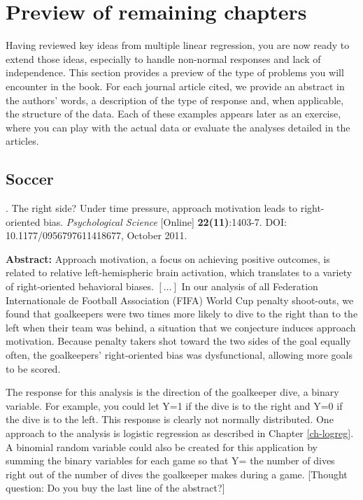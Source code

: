 \documentclass[
]{krantz}
\renewenvironment{quote}{\begin{VF}}{\end{VF}}
\begin{document}
\hypertarget{preview-of-remaining-chapters}{%
\section{Preview of remaining chapters}\label{preview-of-remaining-chapters}}

Having reviewed key ideas from multiple linear regression, you are now ready to extend those ideas, especially to handle non-normal responses and lack of independence. This section provides a preview of the type of problems you will encounter in the book. For each journal article cited, we provide an abstract in the authors' words, a description of the type of response and, when applicable, the structure of the data. Each of these examples appears later as an exercise, where you can play with the actual data or evaluate the analyses detailed in the articles.

\hypertarget{soccer}{%
\subsection{Soccer}\label{soccer}}

\citet{Roskes2011} . The right side? Under time pressure, approach motivation leads to right-oriented bias. \emph{Psychological Science} {[}Online{]} \textbf{22(11)}:1403-7. DOI: 10.1177/0956797611418677, October 2011.

\begin{quote}
\textbf{Abstract:} Approach motivation, a focus on achieving positive outcomes, is related to relative left-hemispheric brain activation, which translates to a variety of right-oriented behavioral biases. \([\ldots]\) In our analysis of all Federation Internationale de Football Association (FIFA) World Cup penalty shoot-outs, we found that goalkeepers were two times more likely to dive to the right than to the left when their team was behind, a situation that we conjecture induces approach motivation. Because penalty takers shot toward the two sides of the goal equally often, the goalkeepers' right-oriented bias was dysfunctional, allowing more goals to be scored.
\end{quote}

The response for this analysis is the direction of the goalkeeper dive, a binary variable. For example, you could let Y=1 if the dive is to the right and Y=0 if the dive is to the left. This response is clearly not normally distributed. One approach to the analysis is logistic regression as described in Chapter \ref{ch-logreg}. A binomial random variable could also be created for this application by summing the binary variables for each game so that Y= the number of dives right out of the number of dives the goalkeeper makes during a game. {[}Thought question: Do you buy the last line of the abstract?{]}
\end{document}
